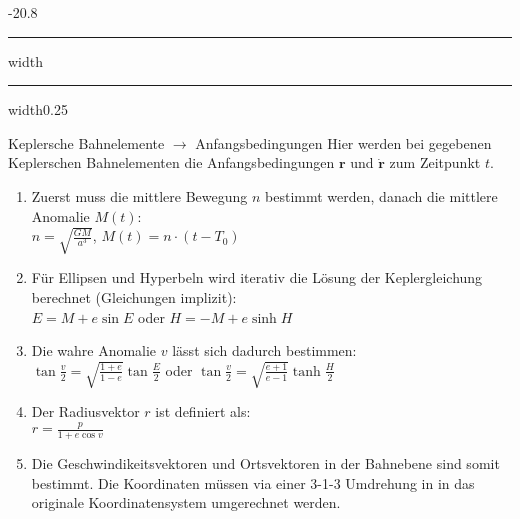 \documentclass[8pt, landscape, fleqn]{scrartcl}
\makeatletter
\renewcommand{\subsection}{\@startsection{subsection}{1}{0mm}%
{-2\baselineskip}{0.8\baselineskip}%
{\hrule depth 0.2pt width\columnwidth\hrule depth0.75pt
width0.25\columnwidth\vspace*{1.2em}\large\bfseries\rmfamily}}
\makeatother
\begin{document}
\begin{multicols*}{3}
\subsection{Keplersche Bahnelemente $\rightarrow$ Anfangsbedingungen}
Hier werden bei gegebenen Keplerschen Bahnelementen die Anfangsbedingungen $\mathbf{r}$ und $\mathbf{\dot{r}}$ zum Zeitpunkt $t$.
\begin{enumerate}
    \item Zuerst muss die mittlere Bewegung $n$ bestimmt werden, danach die mittlere Anomalie $M(t)$:\\
     $n = \sqrt{\frac{GM}{a^3}}$, $M(t) = n\cdot(t-T_0)$
    \item Für Ellipsen und Hyperbeln wird iterativ die Lösung der Keplergleichung berechnet (Gleichungen implizit): \\
    $E = M + e \sin E$ oder $H=-M +e \sinh H$
    \item Die wahre Anomalie $v$ lässt sich dadurch bestimmen:\\
    $\tan \frac{v}{2} = \sqrt{\frac{1+e}{1-e}}\tan \frac{E}{2}$ oder $\tan \frac{v}{2} = \sqrt{\frac{e+1}{e-1}}\tanh \frac{H}{2}$
    \item Der Radiusvektor $r$ ist definiert als:\\
    $r = \frac{p}{1+e \cos v}$
    \item Die Geschwindikeitsvektoren und Ortsvektoren in der Bahnebene sind somit bestimmt. Die Koordinaten müssen via einer 3-1-3 Umdrehung in in das originale Koordinatensystem umgerechnet werden.
\end{enumerate}

\end{multicols*}
\end{document}
